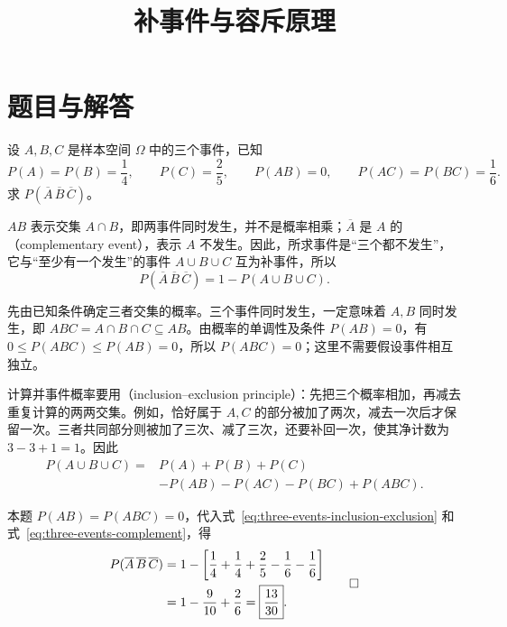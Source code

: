 \documentclass[UTF8]{ctexart}
\title{补事件与容斥原理}
\author{}
\date{}
\begin{document}
\maketitle

\section{题目与解答}
\label{sec:three-events-problem}

\begin{example}
\label{ex:three-events-original}
设 $A,B,C$ 是样本空间 $\Omega$ 中的三个事件，已知
\[
  P(A)=P(B)=\frac14,\qquad P(C)=\frac25,
  \qquad P(AB)=0,\qquad P(AC)=P(BC)=\frac16.
\]
求 $P(\overline A\,\overline B\,\overline C)$。
\end{example}

\begin{solve}
$AB$ 表示交集 $A\cap B$，即两事件同时发生，并不是概率相乘；$\overline A$ 是 $A$ 的（complementary event），表示 $A$ 不发生。因此，所求事件是“三个都不发生”，它与“至少有一个发生”的事件 $A\cup B\cup C$ 互为补事件，所以
\begin{equation}
  P(\overline A\,\overline B\,\overline C)=1-P(A\cup B\cup C).
  \label{eq:three-events-complement}
\end{equation}

先由已知条件确定三者交集的概率。三个事件同时发生，一定意味着 $A,B$ 同时发生，即 $ABC=A\cap B\cap C\subseteq AB$。由概率的单调性及条件 $P(AB)=0$，有 $0\le P(ABC)\le P(AB)=0$，所以 $P(ABC)=0$；这里不需要假设事件相互独立。

计算并事件概率要用（inclusion--exclusion principle）：先把三个概率相加，再减去重复计算的两两交集。例如，恰好属于 $A,C$ 的部分被加了两次，减去一次后才保留一次。三者共同部分则被加了三次、减了三次，还要补回一次，使其净计数为 $3-3+1=1$。因此
\begin{equation}
  \begin{aligned}
    P(A\cup B\cup C)
    ={}&P(A)+P(B)+P(C)\\
       &-P(AB)-P(AC)-P(BC)+P(ABC).
  \end{aligned}
  \label{eq:three-events-inclusion-exclusion}
\end{equation}

本题 $P(AB)=P(ABC)=0$，代入式~\eqref{eq:three-events-inclusion-exclusion} 和式~\eqref{eq:three-events-complement}，得
\begin{equation}
  \begin{aligned}
    P(\overline A\,\overline B\,\overline C)
    &=1-\left[\frac14+\frac14+\frac25-\frac16-\frac16\right]\\
    &=1-\frac9{10}+\frac26=\boxed{\frac{13}{30}}.
  \end{aligned}
  \label{eq:three-events-answer}
  \qedhere
\end{equation}
\end{solve}
\end{document}
